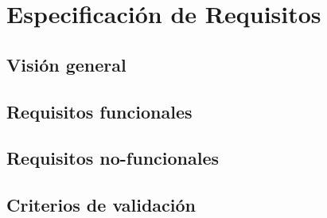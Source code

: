 \chapter{Especificación de Requisitos}

\section{Visión general}

\section{Requisitos funcionales}

\section{Requisitos no-funcionales}

\section{Criterios de validación}